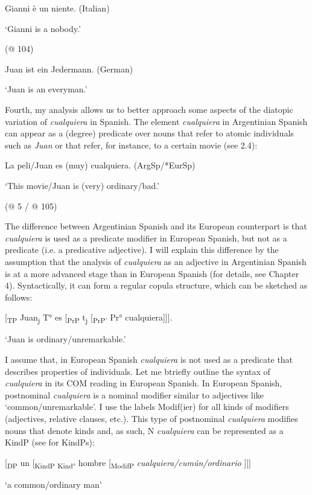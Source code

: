 \documentclass[output=paper]{langscibook}
\begin{document}
  Gianni è un niente.   (Italian)

  ‘Gianni is a nobody.’

  (@ 104)

  Juan ist ein Jedermann.   (German)

  ‘Juan is an everyman.’

Fourth, my analysis allows us to better approach some aspects of the diatopic variation of \textit{cualquiera} in Spanish. The element \textit{cualquiera} in Argentinian Spanish can appear as a (degree) predicate over nouns that refer to atomic individuals such as \textit{Juan} or that refer, for instance, to a certain movie (see 2.4):

  La peli/Juan es (muy) cualquiera.   (ArgSp/*EurSp)

  ‘This movie/Juan is (very) ordinary/bad.’

  (@ 5 / @ 105)

The difference between Argentinian Spanish and its European counterpart is that \textit{cualquiera} is used as a predicate modifier in European Spanish, but not as a predicate (i.e. a predicative adjective). I will explain this difference by the assumption that the analysis of \textit{cualquiera} as an adjective in Argentinian Spanish is at a more advanced stage than in European Spanish (for details, see Chapter 4). Syntactically, it can form a regular copula structure, which can be sketched as follows:

  [\textsubscript{TP} Juan\textsubscript{j} T° es [\textsubscript{PrP} t\textsubscript{j} [\textsubscript{PrP'} Pr° cualquiera]]].

  ‘Juan is ordinary/unremarkable.’

I assume that, in European Spanish \textit{cualquiera} is not used as a predicate that describes properties of individuals. Let me btriefly outline the syntax of \textit{cualquiera} in its COM reading in European Spanish. In European Spanish, postnominal \textit{cualquiera} is a nominal modifier similar to adjectives like ‘common/unremarkable’. I use the labels Modif(ier) for all kinds of modifiers (adjectives, relative clauses, etc.). This type of postnominal \textit{cualquiera} modifies nouns that denote kinds and, as such, N \textit{cualquiera} can be represented as a KindP (see \citealt{Zamparelli2000} for KindPs):

  [\textsubscript{DP} un [\textsubscript{KindP} \textsubscript{Kind°} hombre [\textsubscript{ModifP} \textit{cualquiera/cumún/ordinario} ]]]

  ‘a common/ordinary man’
\end{document}
